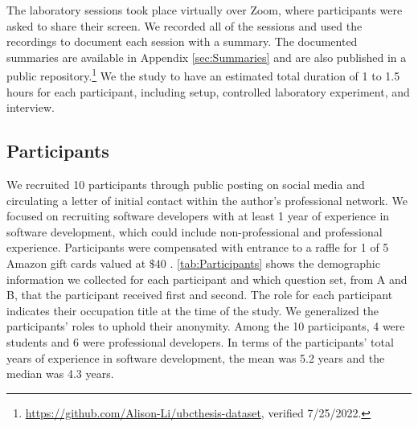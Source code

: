 The laboratory sessions took place virtually over Zoom, where participants were asked to share their screen.
We recorded all of the sessions and used the recordings to document each session with a summary.
The documented summaries are available in Appendix \ref{sec:Summaries} 
and are also published in a public repository.\footnote{\url{https://github.com/Alison-Li/ubcthesis-dataset}, verified 7/25/2022.}
We  the study to have an estimated total duration of 1 to 1.5 hours for each participant,
including setup, controlled laboratory experiment, and interview.

\subsection{Participants}

We recruited 10 participants through public posting on social media and circulating a letter of initial contact within the author's professional network.
We focused on recruiting software developers with at least 1 year of experience in software development, 
which could include non-professional and professional experience.
Participants were compensated with entrance to a raffle for 1 of 5 Amazon gift cards valued at $\$40$ .
\autoref{tab:Participants} shows the demographic information we collected for each participant and 
which question set, from A and B, that the participant received first and second.
The role for each participant indicates their occupation title at the time of the study.
We generalized the participants' roles to uphold their anonymity.
Among the 10 participants, 4 were students and 6 were professional developers.
In terms of the participants' total years of experience in software development, 
the mean was 5.2 years and the median was 4.3 years.

